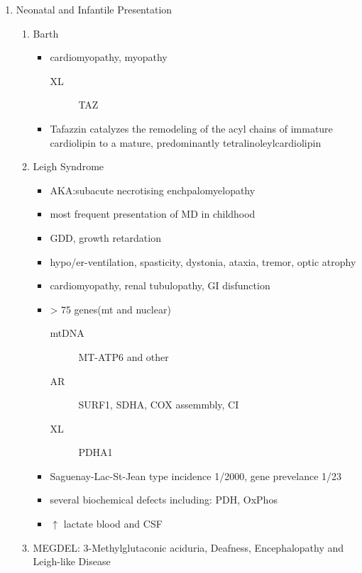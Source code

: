 \documentclass{scrartcl}
\begin{document}
\begin{enumerate}
\item Neonatal and Infantile Presentation
\label{sec:org3e2668e}
\begin{enumerate}
\item Barth
\label{sec:orgd8e6b56}
\begin{itemize}
\item cardiomyopathy, myopathy
\begin{description}
\item[{XL}] TAZ
\end{description}
\item Tafazzin catalyzes the remodeling of the acyl chains of immature
cardiolipin to a mature, predominantly tetralinoleylcardiolipin
\end{itemize}
\item Leigh Syndrome
\label{sec:orgc201f1a}
\begin{itemize}
\item AKA:subacute necrotising enchpalomyelopathy
\item most frequent presentation of MD in childhood
\item GDD, growth retardation
\item hypo/er-ventilation, spasticity, dystonia, ataxia, tremor, optic atrophy
\item cardiomyopathy, renal tubulopathy, GI disfunction
\item \textgreater{} 75 genes(mt and nuclear)
\begin{description}
\item[{mtDNA}] MT-ATP6 and other
\item[{AR}] SURF1, SDHA, COX assemmbly, CI
\item[{XL}] PDHA1
\end{description}
\item Saguenay-Lac-St-Jean type incidence 1/2000, gene prevelance 1/23
\item several biochemical defects including: PDH, OxPhos
\item \(\uparrow\) lactate blood and CSF
\end{itemize}
\item MEGDEL: 3-Methylglutaconic aciduria, Deafness, Encephalopathy and Leigh-like Disease
\label{sec:orgac6c77c}
\end{enumerate}
\end{enumerate}
\end{document}
